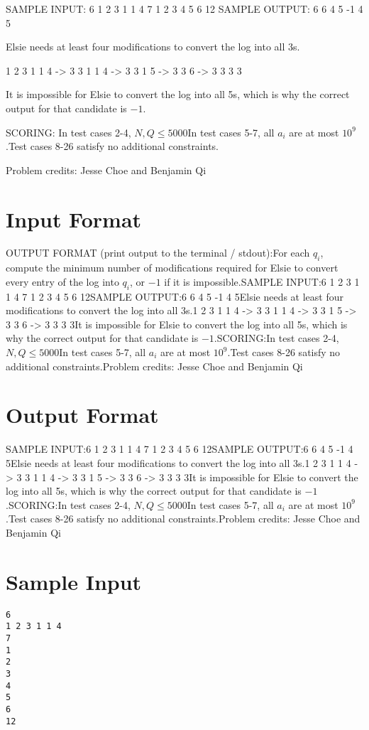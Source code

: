 \documentclass[12pt]{article}
\begin{document}
SAMPLE INPUT:
6
1 2 3 1 1 4
7
1
2
3
4
5
6
12
SAMPLE OUTPUT: 
6
6
4
5
-1
4
5

Elsie needs at least four modifications to convert the log into all 3s.


   1 2 3 1 1 4
-> 3 3 1 1 4
-> 3 3 1 5
-> 3 3 6
-> 3 3 3 3

It is impossible for Elsie to convert the log into all 5s, which is why the 
correct output for that candidate is $-1$.

SCORING:
In test cases 2-4, $N,Q\le 5000$In test cases 5-7, all $a_i$ are at most $10^9$.Test cases 8-26 satisfy no additional constraints.


Problem credits: Jesse Choe and Benjamin Qi



\section*{Input Format}
OUTPUT FORMAT (print output to the terminal / stdout):For each $q_i$, compute the minimum number of modifications required for Elsie
to convert every entry of the log into $q_i$, or $-1$ if it is impossible.SAMPLE INPUT:6
1 2 3 1 1 4
7
1
2
3
4
5
6
12SAMPLE OUTPUT:6
6
4
5
-1
4
5Elsie needs at least four modifications to convert the log into all 3s.1 2 3 1 1 4
-> 3 3 1 1 4
-> 3 3 1 5
-> 3 3 6
-> 3 3 3 3It is impossible for Elsie to convert the log into all 5s, which is why the 
correct output for that candidate is $-1$.SCORING:In test cases 2-4, $N,Q\le 5000$In test cases 5-7, all $a_i$ are at most $10^9$.Test cases 8-26 satisfy no additional constraints.Problem credits: Jesse Choe and Benjamin Qi

\section*{Output Format}
SAMPLE INPUT:6
1 2 3 1 1 4
7
1
2
3
4
5
6
12SAMPLE OUTPUT:6
6
4
5
-1
4
5Elsie needs at least four modifications to convert the log into all 3s.1 2 3 1 1 4
-> 3 3 1 1 4
-> 3 3 1 5
-> 3 3 6
-> 3 3 3 3It is impossible for Elsie to convert the log into all 5s, which is why the 
correct output for that candidate is $-1$.SCORING:In test cases 2-4, $N,Q\le 5000$In test cases 5-7, all $a_i$ are at most $10^9$.Test cases 8-26 satisfy no additional constraints.Problem credits: Jesse Choe and Benjamin Qi

\section*{Sample Input}
\begin{verbatim}
6
1 2 3 1 1 4
7
1
2
3
4
5
6
12
\end{verbatim}
\end{document}
